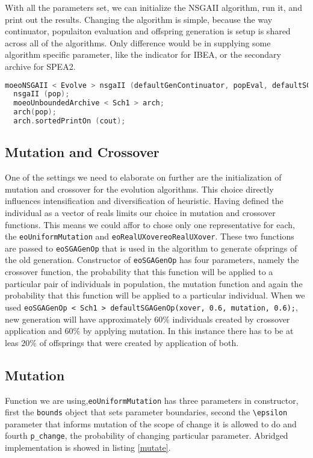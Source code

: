 \documentclass[12pt,oneside]{fithesis2}
\begin{document}
With all the parameters set, we can initialize the NSGAII algorithm, run it, and print out the results.
Changing the algorithm is simple, because the way continuator, populaiton evaluation and offspring generation is setup is shared across all of the algorithms.
Only difference would be in supplying some algorithm specific parameter, like the indicator for IBEA, or the secondary archive for SPEA2.
\begin{lstlisting}[language=C++,label=composition,caption=Individual initialization]
  moeoNSGAII < Evolve > nsgaII (defaultGenContinuator, popEval, defaultSGAGenOp);
  nsgaII (pop);
  moeoUnboundedArchive < Sch1 > arch;
  arch(pop);
  arch.sortedPrintOn (cout);
\end{lstlisting}

\subsection{Mutation and Crossover}
One of the settings we need to elaborate on further are the initialization of mutation and crossover for the evolution algorithms.
This choice directly influences intensification and diversification of heuristic. Having defined the individual as a vector of reals limits our choice in mutation and crossover functions. This means we could affor to chose only one representative for each, the \lstinline$eoUniformMutation$ and \lstinline$eoRealUXovereoRealUXover$. These two functions are passed to \lstinline$eoSGAGenOp$ that is used in the algorithm to generate ofsprings of the old generation. Constructor of \lstinline$eoSGAGenOp$ has four parameters, namely the crossover function, the probability that this function will be applied to a particular pair of individuals in population, the mutation function and again the probability that this function will be applied to a particular individual. When we used \lstinline$eoSGAGenOp < Sch1 > defaultSGAGenOp(xover, 0.6, mutation, 0.6);$,  new generation will have approximately $60\%$ individuals created by crossover application and $60\%$ by applying mutation. In this instance there has to be at leas $20\%$ of offsprings that were created by application of both. 

\subsection{Mutation}
Function we are using,\lstinline$eoUniformMutation$ has three parameters in constructor, first the \lstinline$bounds$ object that sets parameter boundaries, second the \lstinline$\epsilon$ parameter that informs mutation of the scope of change it is allowed to do and fourth \lstinline$p_change$, the probability of changing particular parameter. Abridged implementation is showed in listing \ref{mutate}.
\end{document}
